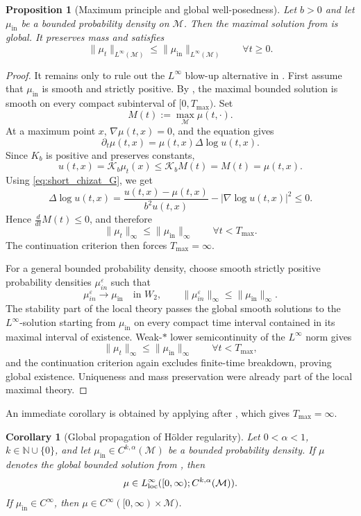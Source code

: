 \documentclass[11pt]{article}
\newtheorem{proposition}[theorem]{Proposition}
\newtheorem{corollary}[theorem]{Corollary}
\theoremstyle{definition}
\def\M{\mathcal M}
\begin{document}
\begin{proposition}[Maximum principle and global well-posedness]\label{prop:pde_global_bounded_wellposedness}
Let \(b>0\) and let \(\mu_{\mathrm{in}}\) be a bounded probability density on
 \(\M\).  Then the maximal solution from
 is global.  It preserves mass and
satisfies
\[
\|\mu_t\|_{L^\infty( \M)}
\le
\|\mu_{\mathrm{in}}\|_{L^\infty( \M)}
\qquad\forall t\ge0.
\]
\end{proposition}

\begin{proof}
It remains only to rule out the \(L^\infty\) blow-up alternative in
.  First assume that \(\mu_{\mathrm{in}}\) is
smooth and strictly positive.  By , the
maximal bounded solution is smooth on every compact subinterval of
\([0,T_{\max})\).  Set
\[
M(t):=\max_{ \M}\mu(t,\cdot).
\]
At a maximum point \(x\), \(\nabla\mu(t,x)=0\), and the equation gives
\[
\partial_t\mu(t,x)=\mu(t,x)\Delta\log u(t,x).
\]
Since \(K_b\) is positive and preserves constants,
\[
u(t,x)=\mathcal K_b\mu_t(x)\le \mathcal K_bM(t)=M(t)=\mu(t,x).
\]
Using \eqref{eq:short_chizat_G}, we get
\[
\Delta\log u(t,x)
=
\frac{u(t,x)-\mu(t,x)}{b^2u(t,x)}
-|\nabla\log u(t,x)|^2
\le0.
\]
Hence \(\frac{d}{dt}M(t)\le0\), and therefore
\[
\|\mu_t\|_\infty\le\|\mu_{\mathrm{in}}\|_\infty
\qquad\forall t<T_{\max}.
\]
The continuation criterion then forces \(T_{\max}=\infty\).

For a general bounded probability density, choose smooth strictly positive
probability densities \(\mu^\varepsilon_{in}\) such that
\[
\mu^\varepsilon_{in}\to\mu_{\mathrm{in}}\quad\text{in }W_2,
\qquad
\|\mu^\varepsilon_{in}\|_\infty\le\|\mu_{\mathrm{in}}\|_\infty .
\]
The stability part of the local theory passes the global smooth solutions to
the \(L^\infty\)-solution starting from \(\mu_{\mathrm{in}}\) on every compact time
interval contained in its maximal interval of existence.  Weak-\(*\) lower
semicontinuity of the \(L^\infty\) norm gives
\[
\|\mu_t\|_\infty\le\|\mu_{\mathrm{in}}\|_\infty
\qquad\forall t<T_{\max},
\]
and the continuation criterion again excludes finite-time breakdown,
proving global existence. Uniqueness and mass preservation were already part of
the local maximal theory.
\end{proof}

An immediate corollary is obtained by applying  after
, which gives \(T_{\max}=\infty\).
\begin{corollary}[Global propagation of Hölder regularity]\label{cor:pde_global_holder_propagation}
Let \(0<\alpha<1\), \(k\in\mathbb N\cup\{0\}\), and let
\(\mu_{\mathrm{in}}\in C^{k,\alpha}( \M)\) be a bounded probability
density.  If \(\mu\) denotes the global bounded solution from
, then
\[
\mu\in L^\infty_{\rm loc}([0,\infty);C^{k,\alpha}( \M)).
\]
If \(\mu_{\mathrm{in}}\in C^\infty\), then
\(\mu\in C^\infty([0,\infty)\times \M)\).
\end{corollary}
\end{document}
